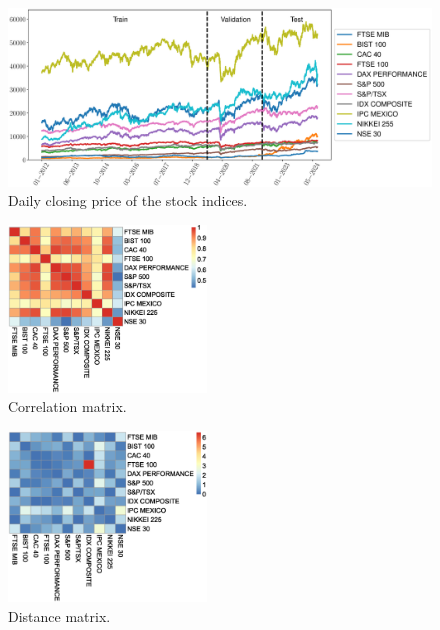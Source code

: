 \begin{figure}
    \centering
    \includegraphics[width=1.0\textwidth]{./figures/alldata.eps}
    \caption{Daily closing price of the stock indices.}
    \label{fig:alldata}
\end{figure}

\begin{figure}[tbh]
  \includegraphics[width=0.47\textwidth]{./figures/cor2.eps}
  \caption{Correlation matrix.} 
  \label{fig:cor2}
\end{figure}

\begin{figure}[tbh]
  \includegraphics[width=0.47\textwidth]{./figures/dist2.eps}
  \caption{Distance matrix.} 
  \label{fig:dist2}
\end{figure}